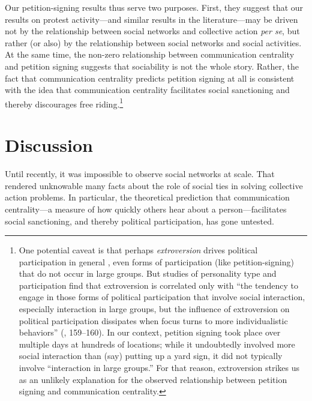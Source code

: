 \documentclass[12pt]{article}
\begin{document}
Our petition-signing results thus serve two purposes. First, they suggest that our results on protest activity---and similar results in the literature---may be driven not by the relationship between social networks and collective action \emph{per se}, but rather (or also) by the relationship between social networks and social activities. At the same time, the non-zero relationship between communication centrality and petition signing suggests that sociability is not the whole story. Rather, the fact that communication centrality predicts petition signing at all is consistent with the idea that communication centrality facilitates social sanctioning and thereby discourages free riding.\footnote{One potential caveat is that perhaps \emph{extroversion} drives political participation in general \citep{Gerber:2011dz}, even forms of participation (like petition-signing) that do not occur in large groups. But studies of personality type and participation find that extroversion is correlated only with ``the tendency to engage in those forms of political participation that involve social interaction, especially interaction in large groups, but the influence of extroversion on political participation dissipates when focus turns to more individualistic behaviors'' (\citealt{Mondak:2010to}, 159--160). In our context, petition signing took place over multiple days at hundreds of locations; while it undoubtedly involved more social interaction than (say) putting up a yard sign, it did not typically involve ``interaction in large groups.'' For that reason, extroversion strikes us as an unlikely explanation for the observed relationship between petition signing and communication centrality.}








\section{Discussion}\label{sec:discussion}

Until recently, it was impossible to observe social networks at scale. That rendered unknowable many facts about the role of social ties in solving collective action problems. In particular, the theoretical prediction that communication centrality---a measure of how quickly others hear about a person---facilitates social sanctioning, and thereby political participation, has gone untested.
\end{document}

